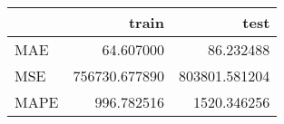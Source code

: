 \begin{tabular}{lrr}
\toprule
{} &          train &           test \\
\midrule
MAE  &      64.607000 &      86.232488 \\
MSE  &  756730.677890 &  803801.581204 \\
MAPE &     996.782516 &    1520.346256 \\
\bottomrule
\end{tabular}
